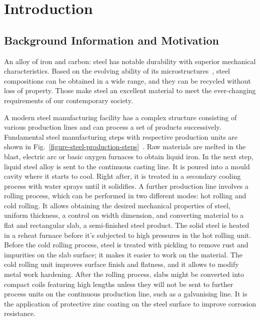 \chapter{Introduction}

\section{Background Information and Motivation}\label{background_information}

An alloy of iron and carbon: steel has notable durability with superior mechanical characteristics. Based on the evolving ability of its microstructures~\cite{bhadeshia2017steels, Tasan2015}, steel compositions can be obtained in a wide range, and they can be recycled without loss of property. Those make steel an excellent material to meet the ever-changing requirements of our contemporary society.

A modern steel manufacturing facility has a complex structure consisting of various production lines and can process a set of products successively. Fundamental steel manufacturing steps with respective production units are shown in Fig.~\ref{figure-steel-production-steps}~\cite{sinha-spinks_2015}. Raw materials are melted in the blast, electric arc or basic oxygen furnaces to obtain liquid iron. In the next step, liquid steel alloy is sent to the continuous casting line. It is poured into a mould cavity where it starts to cool. Right after, it is treated in a secondary cooling process with water sprays until it solidifies. A further production line involves a rolling process, which can be performed in two different modes: hot rolling and cold rolling. It allows obtaining the desired mechanical properties of steel, uniform thickness, a control on width dimension, and converting material to a flat and rectangular slab, a semi-finished steel product. The solid steel is heated in a reheat furnace before it's subjected to high pressures in the hot rolling unit. Before the cold rolling process, steel is treated with pickling to remove rust and impurities on the slab surface; it makes it easier to work on the material. The cold rolling unit improves surface finish and flatness, and it allows to modify metal work hardening. After the rolling process, slabs might be converted into compact coils featuring high lengths unless they will not be sent to further process units on the continuous production line, such as a galvanising line. It is the application of protective zinc coating on the steel surface to improve corrosion resistance.

